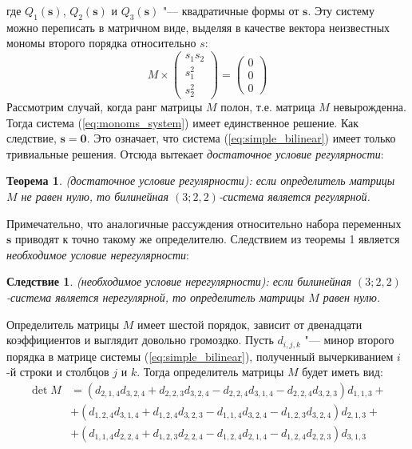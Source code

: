 \documentclass[10pt]{article}
\newtheorem{theorem}{Теорема}
\newtheorem{consequence}{Следствие}
\begin{document}
где $Q_1(\mathbf{s})$, $Q_2(\mathbf{s})$ и $Q_3(\mathbf{s})$ "--- квадратичные формы от $
\mathbf{s}$. Эту систему можно переписать в матричном виде, выделяя в качестве вектора 
неизвестных мономы второго порядка относительно $s$: 
\begin{equation}\label{eq:monoms_system}
	M \times  
	\begin{pmatrix}
		s_1s_2 \\ 
		s_1^2 \\ 
		s_2^2
	\end{pmatrix} = 
	\begin{pmatrix}
		0 \\
		0 \\
		0
	\end{pmatrix}
\end{equation}
Рассмотрим случай, когда ранг матрицы $M$ полон, т.е. матрица $M$ невырожденна. Тогда система (\ref{eq:monoms_system}) имеет единственное решение. Как следствие, $\mathbf{s} = \mathbf{0}$. Это означает, что система (\ref{eq:simple_bilinear}) имеет только тривиальные решения. Отсюда вытекает \textit{достаточное условие регулярности}: 
\begin{theorem}(достаточное условие регулярности):
	если определитель матрицы $M$ не равен нулю, то билинейная $(3;2,2)$-система является
	регулярной. 
\end{theorem}
Примечательно, что аналогичные рассуждения относительно набора переменных $\mathbf{s}$ 
приводят к точно такому же определителю. Следствием из теоремы 1 является \textit{необходимое условие нерегулярности}:
\begin{consequence}(необходимое условие нерегулярности):
если билинейная $(3;2,2)$-система является нерегулярной, то определитель матрицы $M$ равен нулю.
\end{consequence}
Определитель матрицы $M$ имеет шестой порядок, зависит от двенадцати коэффициентов и выглядит довольно громоздко. Пусть $d_{i,j,k}$ "--- минор второго порядка в матрице системы (\ref{eq:simple_bilinear}), полученный вычеркиванием $i$-й строки и столбцов $j$ и $k$. Тогда определитель матрицы $M$ будет иметь вид:
\begin{align*}
 	\det M & = (d_{2,1,4} d_{3,2,4} + d_{2,2,3} d_{3,2,4} - d_{2,2,4} d_{3,1,4} - 
 	d_{2,2,4} d_{3,2,3}) d_{1,1,3} + \\
 	& + (d_{1,2,4} d_{3,1,4} + d_{1,2,4} d_{3,2,3} - d_{1,1,4} d_{3,2,4} -	
	d_{1,2,3} d_{3,2,4}) d_{2,1,3} + \\		 
 	& + (d_{1,1,4} d_{2,2,4} + d_{1,2,3}d_{2,2,4} - d_{1,2,4}d_{2,1,4} - 
	d_{1,2,4} d_{2,2,3}) d_{3,1,3}
\end{align*} 
\end{document}
